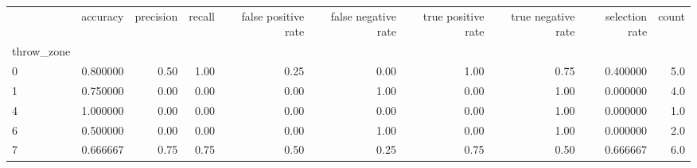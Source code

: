 \begin{tabular}{lrrrrrrrrr}
\toprule
{} &  accuracy &  precision &  recall &  false positive rate &  false negative rate &  true positive rate &  true negative rate &  selection rate &  count \\
throw\_zone &           &            &         &                      &                      &                     &                     &                 &        \\
\midrule
0          &  0.800000 &       0.50 &    1.00 &                 0.25 &                 0.00 &                1.00 &                0.75 &        0.400000 &    5.0 \\
1          &  0.750000 &       0.00 &    0.00 &                 0.00 &                 1.00 &                0.00 &                1.00 &        0.000000 &    4.0 \\
4          &  1.000000 &       0.00 &    0.00 &                 0.00 &                 0.00 &                0.00 &                1.00 &        0.000000 &    1.0 \\
6          &  0.500000 &       0.00 &    0.00 &                 0.00 &                 1.00 &                0.00 &                1.00 &        0.000000 &    2.0 \\
7          &  0.666667 &       0.75 &    0.75 &                 0.50 &                 0.25 &                0.75 &                0.50 &        0.666667 &    6.0 \\
\bottomrule
\end{tabular}

